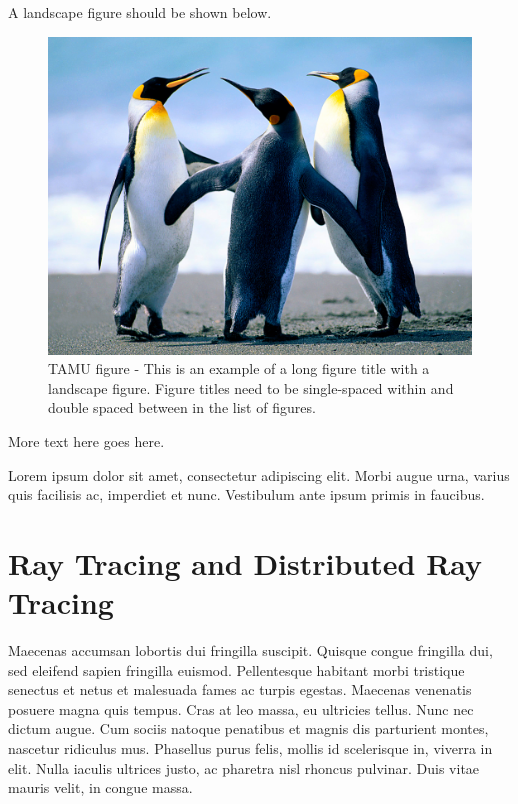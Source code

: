 A landscape figure should be shown below.
\begin{figure}
\centering
\includegraphics[scale=.50]{figures/Penguins.jpg}
\caption{TAMU figure - This is an example of a long figure title with a landscape figure.  Figure titles need to be single-spaced within and double spaced between in the list of figures.}
\label{fig:tamu-fig1-1}
\end{figure}

More text here goes here.


Lorem ipsum dolor sit amet, consectetur adipiscing elit. Morbi augue urna, varius quis facilisis ac, imperdiet et nunc. Vestibulum ante ipsum primis in faucibus.

\section{Ray Tracing and Distributed Ray Tracing}
Maecenas accumsan lobortis dui fringilla suscipit. Quisque congue fringilla dui, sed eleifend sapien fringilla euismod. Pellentesque habitant morbi tristique senectus et netus et malesuada fames ac turpis egestas. Maecenas venenatis posuere magna quis tempus. Cras at leo massa, eu ultricies tellus. Nunc nec dictum augue. Cum sociis natoque penatibus et magnis dis parturient montes, nascetur ridiculus mus. Phasellus purus felis, mollis id scelerisque in, viverra in elit. Nulla iaculis ultrices justo, ac pharetra nisl rhoncus pulvinar. Duis vitae mauris velit, in congue massa.

